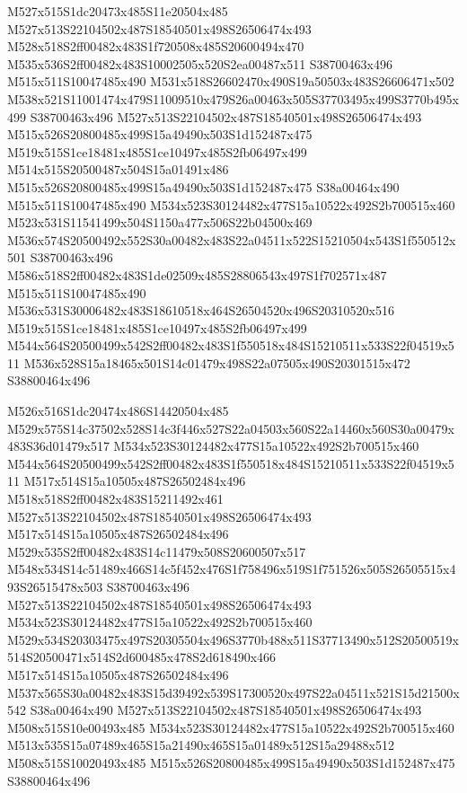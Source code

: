 \documentclass{article}
\begin{document}
\begin{multicols}{2}
M527x515S1dc20473x485S11e20504x485 M527x513S22104502x487S18540501x498S26506474x493 M528x518S2ff00482x483S1f720508x485S20600494x470 M535x536S2ff00482x483S10002505x520S2ea00487x511 S38700463x496 M515x511S10047485x490 M531x518S26602470x490S19a50503x483S26606471x502 M538x521S11001474x479S11009510x479S26a00463x505S37703495x499S3770b495x499 S38700463x496 M527x513S22104502x487S18540501x498S26506474x493 M515x526S20800485x499S15a49490x503S1d152487x475 M519x515S1ce18481x485S1ce10497x485S2fb06497x499 M514x515S20500487x504S15a01491x486 M515x526S20800485x499S15a49490x503S1d152487x475 S38a00464x490 M515x511S10047485x490 M534x523S30124482x477S15a10522x492S2b700515x460 M523x531S11541499x504S1150a477x506S22b04500x469 M536x574S20500492x552S30a00482x483S22a04511x522S15210504x543S1f550512x501 S38700463x496 M586x518S2ff00482x483S1de02509x485S28806543x497S1f702571x487 M515x511S10047485x490 M536x531S30006482x483S18610518x464S26504520x496S20310520x516 M519x515S1ce18481x485S1ce10497x485S2fb06497x499 M544x564S20500499x542S2ff00482x483S1f550518x484S15210511x533S22f04519x511 M536x528S15a18465x501S14c01479x498S22a07505x490S20301515x472 S38800464x496

M526x516S1dc20474x486S14420504x485 M529x575S14c37502x528S14c3f446x527S22a04503x560S22a14460x560S30a00479x483S36d01479x517 M534x523S30124482x477S15a10522x492S2b700515x460 M544x564S20500499x542S2ff00482x483S1f550518x484S15210511x533S22f04519x511 M517x514S15a10505x487S26502484x496 M518x518S2ff00482x483S15211492x461 M527x513S22104502x487S18540501x498S26506474x493 M517x514S15a10505x487S26502484x496 M529x535S2ff00482x483S14c11479x508S20600507x517 M548x534S14c51489x466S14c5f452x476S1f758496x519S1f751526x505S26505515x493S26515478x503 S38700463x496 M527x513S22104502x487S18540501x498S26506474x493 M534x523S30124482x477S15a10522x492S2b700515x460 M529x534S20303475x497S20305504x496S3770b488x511S37713490x512S20500519x514S20500471x514S2d600485x478S2d618490x466 M517x514S15a10505x487S26502484x496 M537x565S30a00482x483S15d39492x539S17300520x497S22a04511x521S15d21500x542 S38a00464x490 M527x513S22104502x487S18540501x498S26506474x493 M508x515S10e00493x485 M534x523S30124482x477S15a10522x492S2b700515x460 M513x535S15a07489x465S15a21490x465S15a01489x512S15a29488x512 M508x515S10020493x485 M515x526S20800485x499S15a49490x503S1d152487x475 S38800464x496


\end{multicols}
\end{document}
